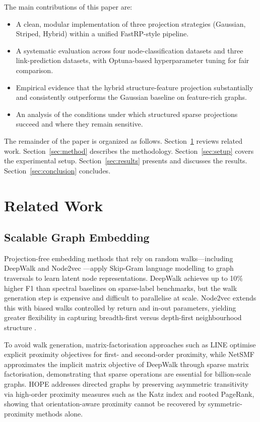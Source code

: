 \documentclass[conference]{IEEEtran}
\begin{document}
The main contributions of this paper are:
\begin{itemize}
    \item A clean, modular implementation of three projection strategies
          (Gaussian, Striped, Hybrid) within a unified FastRP-style pipeline.
    \item A systematic evaluation across four node-classification datasets
          and three link-prediction datasets, with Optuna-based
          hyperparameter tuning for fair comparison.
    \item Empirical evidence that the hybrid structure-feature projection
          substantially and consistently outperforms the Gaussian baseline on
          feature-rich graphs.
    \item An analysis of the conditions under which structured sparse
          projections succeed and where they remain sensitive.
\end{itemize}

The remainder of the paper is organized as follows. Section~\ref{sec:related}
reviews related work. Section~\ref{sec:method} describes the methodology.
Section~\ref{sec:setup} covers the experimental setup. Section~\ref{sec:results}
presents and discusses the results. Section~\ref{sec:conclusion} concludes.

\section{Related Work}
\label{sec:related}

\subsection{Scalable Graph Embedding}

Projection-free embedding methods that rely on random walks---including
DeepWalk \cite{perozzi2014} and Node2vec \cite{grover2016node2vec}---apply
Skip-Gram language modelling to graph traversals to learn latent node
representations. DeepWalk achieves up to 10\% higher F1 than spectral
baselines on sparse-label benchmarks, but the walk generation step is
expensive and difficult to parallelise at scale. Node2vec extends this with
biased walks controlled by return and in-out parameters, yielding greater
flexibility in capturing breadth-first versus depth-first neighbourhood
structure \cite{grover2016node2vec}.

To avoid walk generation, matrix-factorisation approaches such as
LINE \cite{tang2015line} optimise explicit proximity objectives for first-
and second-order proximity, while NetSMF \cite{qiu2019netsmf} approximates
the implicit matrix objective of DeepWalk through sparse matrix factorisation,
demonstrating that sparse operations are essential for billion-scale graphs.
HOPE \cite{ou2016atp} addresses directed graphs by preserving asymmetric
transitivity via high-order proximity measures such as the Katz index and
rooted PageRank, showing that orientation-aware proximity cannot be
recovered by symmetric-proximity methods alone.
\end{document}
